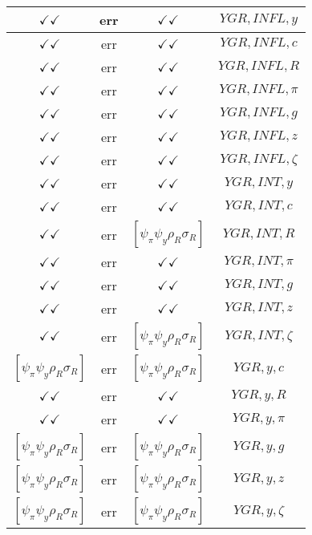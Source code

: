 \documentclass[a4paper,10pt]{article}
\begin{document}
\begin{longtable}{|c|c|c|c|}
\hline
$\checkmark\checkmark$ & err & $\checkmark\checkmark$ & ${YGR},{INFL},{y}$ \\
\hline
$\checkmark\checkmark$ & err & $\checkmark\checkmark$ & ${YGR},{INFL},{c}$ \\
\hline
$\checkmark\checkmark$ & err & $\checkmark\checkmark$ & ${YGR},{INFL},{R}$ \\
\hline
$\checkmark\checkmark$ & err & $\checkmark\checkmark$ & ${YGR},{INFL},{\pi}$ \\
\hline
$\checkmark\checkmark$ & err & $\checkmark\checkmark$ & ${YGR},{INFL},{g}$ \\
\hline
$\checkmark\checkmark$ & err & $\checkmark\checkmark$ & ${YGR},{INFL},{z}$ \\
\hline
$\checkmark\checkmark$ & err & $\checkmark\checkmark$ & ${YGR},{INFL},{\zeta}$ \\
\hline
$\checkmark\checkmark$ & err & $\checkmark\checkmark$ & ${YGR},{INT},{y}$ \\
\hline
$\checkmark\checkmark$ & err & $\checkmark\checkmark$ & ${YGR},{INT},{c}$ \\
\hline
$\checkmark\checkmark$ & err & $[\psi_\pi \psi_y \rho_R \sigma_R ]$ & ${YGR},{INT},{R}$ \\
\hline
$\checkmark\checkmark$ & err & $\checkmark\checkmark$ & ${YGR},{INT},{\pi}$ \\
\hline
$\checkmark\checkmark$ & err & $\checkmark\checkmark$ & ${YGR},{INT},{g}$ \\
\hline
$\checkmark\checkmark$ & err & $\checkmark\checkmark$ & ${YGR},{INT},{z}$ \\
\hline
$\checkmark\checkmark$ & err & $[\psi_\pi \psi_y \rho_R \sigma_R ]$ & ${YGR},{INT},{\zeta}$ \\
\hline
$[\psi_\pi \psi_y \rho_R \sigma_R ]$ & err & $[\psi_\pi \psi_y \rho_R \sigma_R ]$ & ${YGR},{y},{c}$ \\
\hline
$\checkmark\checkmark$ & err & $\checkmark\checkmark$ & ${YGR},{y},{R}$ \\
\hline
$\checkmark\checkmark$ & err & $\checkmark\checkmark$ & ${YGR},{y},{\pi}$ \\
\hline
$[\psi_\pi \psi_y \rho_R \sigma_R ]$ & err & $[\psi_\pi \psi_y \rho_R \sigma_R ]$ & ${YGR},{y},{g}$ \\
\hline
$[\psi_\pi \psi_y \rho_R \sigma_R ]$ & err & $[\psi_\pi \psi_y \rho_R \sigma_R ]$ & ${YGR},{y},{z}$ \\
\hline
$[\psi_\pi \psi_y \rho_R \sigma_R ]$ & err & $[\psi_\pi \psi_y \rho_R \sigma_R ]$ & ${YGR},{y},{\zeta}$ \\

\end{longtable}
\end{document}
